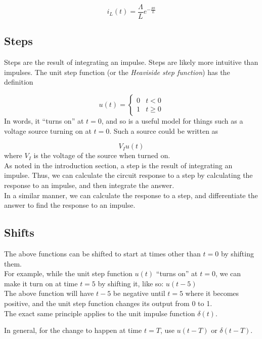\documentclass[12pt,a4paper]{report}
\begin{document}
\[ i_L(t) = \frac{\Lambda}{L} e^{-\frac{R t}{L}} \] 

\subsection{Steps}
Steps are the result of integrating an impulse. Steps are likely more intuitive than impulses. The unit step function (or the \emph{Heaviside step function}) has the definition

\[ u(t) = 
  \begin{cases}
   0  & t < 0 \\
   1  & t \ge 0
  \end{cases}
\]
In words, it ``turns on'' at $t = 0$, and so is a useful model for things such as a voltage source turning on at $t = 0$. Such a source could be written as

\[ V_I u(t) \]
where $V_I$ is the voltage of the source when turned on.\\

As noted in the introduction section, a step is the result of integrating an impulse. Thus, we can calculate the circuit response to a step by calculating the response to an impulse, and then integrate the answer.\\
In a similar manner, we can calculate the response to a step, and differentiate the answer to find the response to an impulse.

\subsection{Shifts}
The above functions can be shifted to start at times other than $t = 0$ by shifting them.\\
For example, while the unit step function $u(t)$ ``turns on'' at $t = 0$, we can make it turn on at time $t = 5$ by shifting it, like so: $u(t - 5)$\\
The above function will have $t - 5$ be negative until $t = 5$ where it becomes positive, and the unit step function changes its output from 0 to 1.\\
The exact same principle applies to the unit impulse function $\delta(t)$.

In general, for the change to happen at time $t = T$, use $u(t - T)$ or $\delta(t - T)$.
\end{document}

